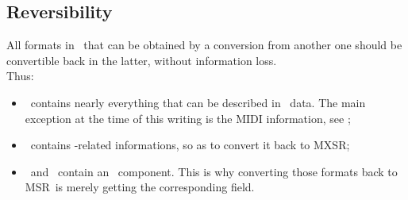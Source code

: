 \subsection{Reversibility}\label{Reversibility}

All formats in \mf\ that can be obtained by a conversion from another one should be convertible back in the latter, without information loss.\\
Thus:
\begin{itemize}
\item \mxsrRepr\ contains nearly everything that can be described in \mxml\ data. The main exception at the time of this writing is the MIDI information, see ;
\item \msrRepr\ contains \mxml-related informations, so as to convert it back to MXSR;
\item \lpsrRepr\ and \bsrRepr\ contain an \msrRepr\ component. This is why converting those formats back to MSR\ is merely getting the corresponding field.
\end{itemize}

